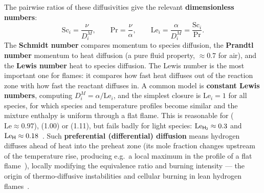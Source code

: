 {The pairwise ratios of these diffusivities give the relevant \textbf{dimensionless numbers}:
\begin{equation*}
\mathrm{Sc}_i = \frac{\nu}{D_i^M}, \qquad \mathrm{Pr} = \frac{\nu}{\alpha}, \qquad \mathrm{Le}_i = \frac{\alpha}{D_i^M} = \frac{\mathrm{Sc}_i}{\mathrm{Pr}}.
\end{equation*}
The \textbf{Schmidt number} compares momentum to species diffusion, the \textbf{Prandtl number} momentum to heat diffusion (a pure fluid property, $\approx 0.7$ for air), and the \textbf{Lewis number} heat to species diffusion. The Lewis number is the most important one for flames: it compares how fast heat diffuses out of the reaction zone with how fast the reactant diffuses in. A common model is \textbf{constant Lewis numbers}, computing $D_i^M = \alpha/\mathrm{Le}_i$, and the simplest closure is $\mathrm{Le}_i = 1$ for all species, for which species and temperature profiles become similar and the mixture enthalpy is uniform through a flat flame. This is reasonable for  ($\mathrm{Le} \approx 0.97$),  (1.00) or  (1.11), but fails badly for light species: $\mathrm{Le}_{\ce{H2}} \approx 0.3$ and $\mathrm{Le}_{\ce{H}} \approx 0.18$~\cite{lecture8,turns2000introduction}. Such \textbf{preferential (differential) diffusion} means hydrogen diffuses ahead of heat into the preheat zone (its mole fraction changes upstream of the temperature rise, producing e.g.\ a local maximum in the  profile of a flat  flame~\cite{warnatz2006combustion}), locally modifying the equivalence ratio and burning intensity --- the origin of thermo-diffusive instabilities and cellular burning in lean hydrogen flames~\cite{day2009cellular}.
}
